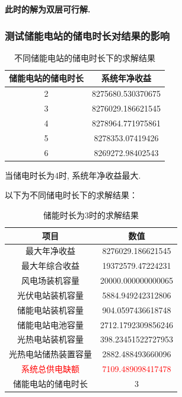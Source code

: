 \documentclass{article}
\begin{document}
\bf{此时的解为双层可行解}.

\subsubsection{测试储能电站的储电时长对结果的影响}
\begin{table}[H]
    \centering
    \caption{不同储能电站的储电时长下的求解结果}
    \label{tab:energy_system_data_2_6}
    \begin{tabular}{c|c}
        \toprule
        \textbf{储能电站的储电时长} & \textbf{系统年净收益} \\
        \midrule
        2 & 8275680.530370675 \\
        3 & 8276029.186621545 \\
        4 & 8278964.771975861 \\
        5 & 8278353.07419426 \\
        6 & 8269272.98402543 \\
        \bottomrule
    \end{tabular}
\end{table}

当储电时长为4时, 系统年净收益最大.

以下为不同储电时长下的求解结果：
\begin{table}[H]
    \centering
    \caption{储能时长为3时的求解结果}
    \label{tab:energy_system_data_3}
    \begin{tabular}{c|c}
        \toprule
        \textbf{项目} & \textbf{数值} \\
        \midrule
        最大年净收益 & 8276029.186621545 \\
        最大年综合收益 & 19372579.47224231 \\
        风电场装机容量 & 20000.000000000065 \\
        光伏电站装机容量 & 5884.949242312806 \\
        储能电站装机容量 & 904.0597436618748 \\
        储能电站电池容量 & 2712.1792309856246 \\
        光热电站装机容量 & 398.23451522727953 \\
        光热电站储热装置容量 & 2882.488493660096 \\
        \textcolor{red}{系统总供电缺额} & \textcolor{red}{7109.489098417478} \\
        储能电站的储电时长 & 3 \\
        \bottomrule
    \end{tabular}
\end{table}
\end{document}
